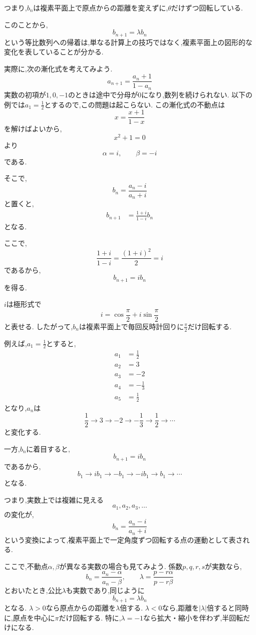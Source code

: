   つまり,$b_n$は複素平面上で原点からの距離を変えずに,$\theta$だけずつ回転している.
  
  このことから,
  \[
    b_{n+1}=\lambda b_n
  \]
  という等比数列への帰着は,単なる計算上の技巧ではなく,複素平面上の図形的な変化を表していることが分かる.
  
  実際に,次の漸化式を考えてみよう.
  \[
    a_{n+1}=\frac{a_n+1}{1-a_n}
  \]
  実数の初項が$1,0,-1$のときは途中で分母が0になり,数列を続けられない.
  以下の例では$a_1=\frac12$とするので,この問題は起こらない.
  この漸化式の不動点は
  \[
    x=\frac{x+1}{1-x}
  \]
  を解けばよいから,
  \[
    x^2+1=0
  \]
  より
  \[
    \alpha=i,\qquad\beta=-i
  \]
  である.
  
  そこで,
  \[
    b_n=\frac{a_n-i}{a_n+i}
  \]
  と置くと,
  \begin{align*}
    b_{n+1}
    &=
    \frac{1+i}{1-i}b_n
  \end{align*}
  となる.
  
  ここで,
  \[
    \frac{1+i}{1-i}
    =
    \frac{(1+i)^2}{2}
    =i
  \]
  であるから,
  \[
    b_{n+1}=ib_n
  \]
  を得る.
  
  $i$は極形式で
  \[
    i=\cos\frac{\pi}{2}+i\sin\frac{\pi}{2}
  \]
  と表せる.
  したがって,$b_n$は複素平面上で毎回反時計回りに$\frac{\pi}{2}$だけ回転する.
  
  例えば,$a_1=\frac12$とすると,
  \begin{align*}
    a_1&=\frac12\\
    a_2&=3\\
    a_3&=-2\\
    a_4&=-\frac13\\
    a_5&=\frac12
  \end{align*}
  となり,$a_n$は
  \[
    \frac12\longrightarrow3\longrightarrow-2
    \longrightarrow-\frac13\longrightarrow\frac12\longrightarrow\cdots
  \]
  と変化する.
  
  一方,$b_n$に着目すると,
  \[
    b_{n+1}=ib_n
  \]
  であるから,
  \[
    b_1\longrightarrow ib_1\longrightarrow-b_1
    \longrightarrow-ib_1\longrightarrow b_1\longrightarrow\cdots
  \]
  となる.
  
  つまり,実数上では複雑に見える
  \[
    a_1,a_2,a_3,\ldots
  \]
  の変化が,
  \[
    b_n=\frac{a_n-i}{a_n+i}
  \]
  という変換によって,複素平面上で一定角度ずつ回転する点の運動として表される.
  
  ここで,不動点$\alpha,\beta$が異なる実数の場合も見てみよう.
  係数$p,q,r,s$が実数なら,
  \[
    b_n=\frac{a_n-\alpha}{a_n-\beta},
    \qquad
    \lambda=\frac{p-r\alpha}{p-r\beta}
  \]
  とおいたとき,公比$\lambda$も実数であり,同じように
  \[
    b_{n+1}=\lambda b_n
  \]
  となる.
  $\lambda>0$なら原点からの距離を$\lambda$倍する.
  $\lambda<0$なら,距離を$|\lambda|$倍すると同時に,原点を中心に$\pi$だけ回転する.
  特に,$\lambda=-1$なら拡大・縮小を伴わず,半回転だけになる.

